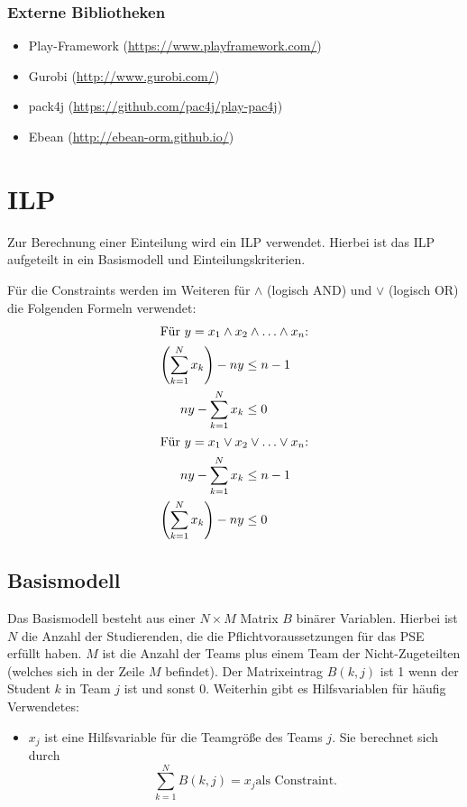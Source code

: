 \documentclass[parskip=full]{scrartcl}
\begin{document}
   \subsubsection{Externe Bibliotheken}
\begin{itemize}
    \item Play-Framework (\url{https://www.playframework.com/})
    \item Gurobi (\url{http://www.gurobi.com/})
    \item pack4j (\url{https://github.com/pac4j/play-pac4j})
    \item Ebean (\url{http://ebean-orm.github.io/})
   \end{itemize}
   \pagebreak
   
   \section{ILP}
Zur Berechnung einer Einteilung wird ein ILP verwendet. Hierbei ist das ILP
aufgeteilt in ein Basismodell und Einteilungskriterien. 

Für die Constraints werden im Weiteren für $\wedge$ (logisch AND) und
$\vee$ (logisch OR) die Folgenden Formeln verwendet:
\begin{align*}
\intertext{Für $y = x_1 \wedge x_2 \wedge \ldots \wedge x_n$:} 
\left(\sum_{k=1}^{N}x_k \right)-ny & \le n-1\\
ny - \sum_{k=1}^{N}x_k & \le 0\\
\intertext{Für  $y = x_1 \vee x_2 \vee \ldots \vee x_n$:}
ny - \sum_{k=1}^{N}x_k & \le n-1\\
\left(\sum_{k=1}^{N}x_k \right) - ny  &\le 0
\end{align*}
\subsection{Basismodell}
Das Basismodell besteht aus einer $N \times M$ Matrix $B$ binärer Variablen.
Hierbei ist $N$ die Anzahl der Studierenden, die die Pflichtvoraussetzungen für das PSE
erfüllt haben. $M$ ist die Anzahl der Teams plus einem Team
der Nicht-Zugeteilten (welches sich in der Zeile $M$ befindet). Der
Matrixeintrag $B(k,j)$ ist 1 wenn der Student $k$ in Team $j$ ist und sonst 0.
Weiterhin gibt es Hilfsvariablen für häufig Verwendetes: 
\begin{itemize}
  \item $x_j$ ist eine Hilfsvariable für die Teamgröße des Teams $j$. Sie berechnet
sich durch
\begin{equation*}
\sum_{k = 1}^{N} B(k,j) = x_j  \text{
als Constraint.}
\end{equation*}
\end{itemize}
\end{document}
